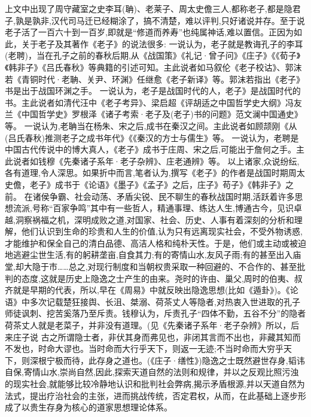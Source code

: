 \documentclass[a4paper,12pt,UTF8,twoside]{ctexbook}
\begin{document}
上文中出现了周守藏室之史李耳(聃)、老莱子、周太史儋三人,都称老子,都是隐君子,孰是孰非,汉代司马迁已经糊涂了，搞不清楚，难以评判,只好诸说并存。至于说老子活了一百六十到一百岁,即就是“修道而养寿”也纯属神话,难以置信。正因为如此，关于老子及其著作《老子》的说法很多:
一说认为，老子就是教诲孔子的李耳(老聘)，当在孔子之前的春秋后期,从《战国策》《礼记·曾子问》《庄子》《《荀子》《韩非子》《吕氏春秋》等典籍的引述可知。主此说者如马叙伦《老子校诂》、郭沫若《青铜时代·老聃、关尹、环渊》任继愈《老子新译》等。郭沫若指出《老子》书是出于战国环渊之手。
一说认为，老子是战国时代的人，老子》是战国时代的书。主此说者如清代汪中《老子考异》、梁启超《评胡适之中国哲学史大纲》冯友兰《中国哲学史》罗根泽《诸子考索·老子及(老子)书的问题》范文澜中国通史》等。
一说认为,老聃当在杨朱、宋之后,成书在秦汉之间。主此说者如顾颉刚《从(吕氏春秋)推测老子之成书年代》《《秦汉的方士与儒生》等。
一说认为，老聘是中国古代传说中的博大真人，《老子》成书于庄周、宋之后,可能出于詹何之手。主此说者如钱穆《先秦诸子系年·老子杂辨》、庄老通辨》等。
以上诸家,众说纷纭,各有道理,令人深思。如果折中而言,笔者认为,撰写《老子》的作者是战国时期周太史儋，老子》成书于《论语》《墨子》《孟子》之后，庄子》苟子》《韩非子》之前。
在诸侯争霸、社会动荡、矛盾尖锐、民不聊生的春秋战国时期,活跃着许多思想流派,号称“百家争鸣”其中有一些哲人，精通事理、练达人生,博通古今，见识卓越,洞察祸福之机，深明成败之道,对国家、社会、历史、人事有着深刻的分析和理解，他们认识到生命的珍贵和人生的价值,认为只有远离现实社会，不受外物诱惑,才能维护和保全自己的清白品德、高洁人格和纯朴天性。于是，他们或主动或被迫地逃避尘世生活,有的躬耕垄亩,自食其力;有的寄情山水,友风子雨;有的甚至出入庙堂,却大隐于市……总之,对现行制度和当朝权贵采取一种回避的、不合作的、甚至批判的态度,这就是历史上隐逸之士产生的由来。尧时的许由、巢父,周时的伯夷、叔齐就是早期的代表，所以,早在《周易》中就反映出隐逸思想(比如《遁卦》)。《论语》中多次记载楚狂接舆、长沮、桀溺、荷茶丈人等隐者,对热衷入世进取的孔子师徒讽刺、挖苦奚落乃至斥责。钱穆认为，斥责孔子“四体不勤，五谷不分”的隐者荷茶丈人就是老菜子，并非没有道理。(见《先秦诸子系年·老子杂辨》所以，后来庄子说
古之所谓隐士者，非伏其身而弗见也，非闭其言而不出也，非藏其知而不发也，时命大谬也。当时命而大行乎天下，则返一无迹;不当时命而大穷乎天下，则深根宁极而待，此存身之道也。(《庄子·缮性》)隐逸之士既然避世存身,韬讳自保,寄情山水,崇尚自然,因此,探索天道自然的法则和规律，并以之反观比照污浊的现实社会,就能够比较冷静地认识和批判社会弊病,揭示矛盾根源,并以天道自然为法式，提出疗治社会的主张，进而挑战传统，否定君权，从而，在此基础上逐步形成了以贵生存身为核心的道家思想理论体系。
\end{document}
